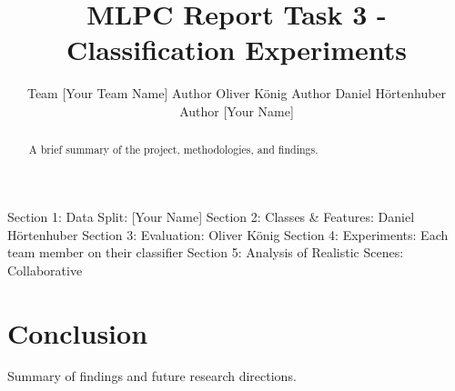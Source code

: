\documentclass{article}
\title{MLPC Report Task 3 - Classification Experiments}
\author{%
  Team [Your Team Name] \AND
  Author Oliver König \AND
  Author Daniel Hörtenhuber \AND
  Author [Your Name]
}
\begin{document}
\maketitle

\begin{abstract}
A brief summary of the project, methodologies, and findings.
\end{abstract}

\begin{contributions}
  Section 1: Data Split: [Your Name] \AND
  Section 2: Classes & Features: Daniel Hörtenhuber \AND
  Section 3: Evaluation: Oliver König \AND
  Section 4: Experiments: Each team member on their classifier \AND
  Section 5: Analysis of Realistic Scenes: Collaborative
\end{contributions}







\section{Conclusion}
Summary of findings and future research directions.
\end{document}
